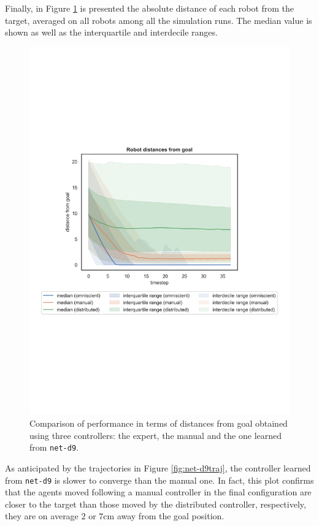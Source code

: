Finally, in Figure \ref{fig:net-d9distance} is presented the absolute distance of 
each robot from the target, averaged on all robots among all the simulation runs. 
The median value is shown as well as the interquartile and interdecile ranges.
\begin{figure}[!htb]
	\centering
	\includegraphics[width=.65\textwidth]{contents/images/net-d9/distances-from-goal-compressed-distributed}%
	\caption[Evaluation of \texttt{net-d9} distances from goal.]{Comparison of 
		performance in terms of distances from goal obtained using three 
		controllers: the expert, the manual and the one learned from \texttt{net-d9}.}
	\label{fig:net-d9distance}
\end{figure}
As anticipated by the trajectories in Figure \ref{fig:net-d9traj}, the controller 
learned from \texttt{net-d9} is slower to converge than the manual one. In fact, 
this plot confirms that the agents moved following a manual controller in the final 
configuration are closer to the target than those moved by the distributed 
controller, respectively, they are on average $2$ or $7$\gls{cm} away from the 
goal position.

